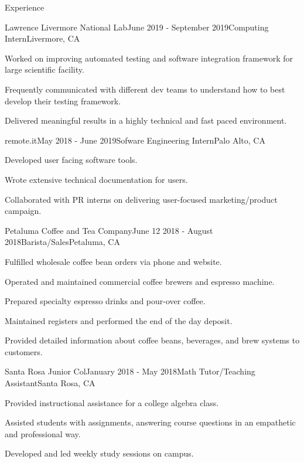 \documentclass{resume} %
\begin{document}
\begin{rSection}{Experience}
    \begin{rSubsection}{Lawrence Livermore National Lab}{June 2019 - September 2019}{Computing Intern}{Livermore, CA}
        \item Worked on improving automated testing and software integration framework for large scientific facility.
        \item Frequently communicated with different dev teams to understand how to best develop their testing framework.
        \item Delivered meaningful results in a highly technical and fast paced environment.
    \end{rSubsection}

    \begin{rSubsection}{remote.it}{May 2018 - June 2019}{Sofware Engineering Intern}{Palo Alto, CA}
        \item Developed user facing software tools.
        \item Wrote extensive technical documentation for users.
        \item Collaborated with PR interns on delivering user-focused marketing/product campaign. 
    \end{rSubsection}

    \begin{rSubsection}{Petaluma Coffee and Tea Company}{June 12 2018 - August 2018}{Barista/Sales}{Petaluma, CA}
        \item Fulfilled wholesale coffee bean orders via phone and website.
        \item Operated and maintained commercial coffee brewers and espresso machine.
        \item Prepared specialty espresso drinks and pour-over coffee.
        \item Maintained registers and performed the end of the day deposit.
        \item Provided detailed information about coffee beans, beverages, and brew systems to customers.

    \end{rSubsection}

    \begin{rSubsection}{Santa Rosa Junior Col}{January 2018 - May 2018}{Math Tutor/Teaching Assistant}{Santa Rosa, CA}
        \item Provided instructional assistance for a college algebra class. 
        \item Assisted students with assignments, answering course questions in an empathetic and professional way.
        \item Developed and led weekly study sessions on campus.
        
    \end{rSubsection}

\end{rSection}
\end{document}
